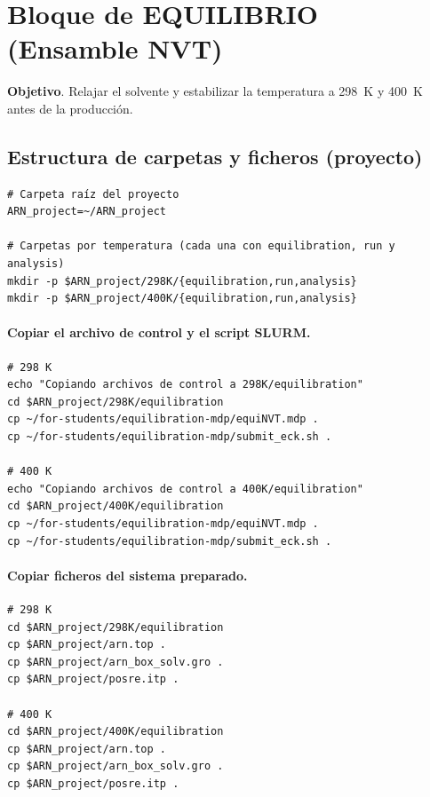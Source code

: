 \documentclass[12pt,a4paper]{article}
\begin{document}
\section{Bloque de EQUILIBRIO (Ensamble NVT)}
\label{sec:equilibrio}
\textbf{Objetivo}. Relajar el solvente y estabilizar la temperatura a \SI{298}{K} y \SI{400}{K} antes de la producción.

\subsection{Estructura de carpetas y ficheros (proyecto)}
\begin{lstlisting}[style=bashstyle]
# Carpeta raíz del proyecto
ARN_project=~/ARN_project

# Carpetas por temperatura (cada una con equilibration, run y analysis)
mkdir -p $ARN_project/298K/{equilibration,run,analysis}
mkdir -p $ARN_project/400K/{equilibration,run,analysis}
\end{lstlisting}

\paragraph{Copiar el archivo de control y el script SLURM.}
\begin{lstlisting}[style=bashstyle]
# 298 K
echo "Copiando archivos de control a 298K/equilibration"
cd $ARN_project/298K/equilibration
cp ~/for-students/equilibration-mdp/equiNVT.mdp .
cp ~/for-students/equilibration-mdp/submit_eck.sh .

# 400 K
echo "Copiando archivos de control a 400K/equilibration"
cd $ARN_project/400K/equilibration
cp ~/for-students/equilibration-mdp/equiNVT.mdp .
cp ~/for-students/equilibration-mdp/submit_eck.sh .
\end{lstlisting}

\paragraph{Copiar ficheros del sistema preparado.}
\begin{lstlisting}[style=bashstyle]
# 298 K
cd $ARN_project/298K/equilibration
cp $ARN_project/arn.top .
cp $ARN_project/arn_box_solv.gro .
cp $ARN_project/posre.itp .

# 400 K
cd $ARN_project/400K/equilibration
cp $ARN_project/arn.top .
cp $ARN_project/arn_box_solv.gro .
cp $ARN_project/posre.itp .
\end{lstlisting}
\end{document}
